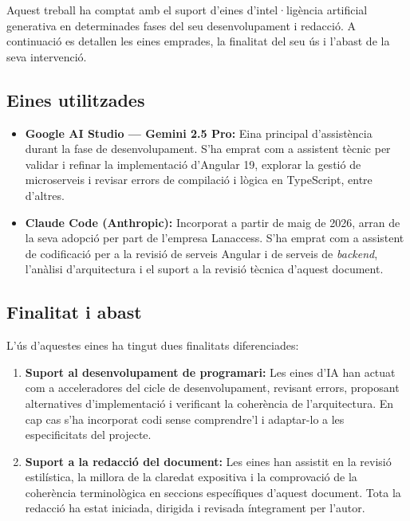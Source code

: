 Aquest treball ha comptat amb el suport d'eines d'intel·ligència artificial generativa en determinades fases del seu desenvolupament i redacció. A continuació es detallen les eines emprades, la finalitat del seu ús i l'abast de la seva intervenció.

\subsection*{Eines utilitzades}

\begin{itemize}
    \item \textbf{Google AI Studio — Gemini 2.5 Pro:} Eina principal d'assistència durant la fase de desenvolupament. S'ha emprat com a assistent tècnic per validar i refinar la implementació d'Angular 19, explorar la gestió de microserveis i revisar errors de compilació i lògica en TypeScript, entre d'altres.

    \item \textbf{Claude Code (Anthropic):} Incorporat a partir de maig de 2026, arran de la seva adopció per part de l'empresa Lanaccess. S'ha emprat com a assistent de codificació per a la revisió de serveis Angular i de serveis de \textit{backend}, l'anàlisi d'arquitectura i el suport a la revisió tècnica d'aquest document.
\end{itemize}

\subsection*{Finalitat i abast}

L'ús d'aquestes eines ha tingut dues finalitats diferenciades:

\begin{enumerate}
    \item \textbf{Suport al desenvolupament de programari:} Les eines d'IA han actuat com a acceleradores del cicle de desenvolupament, revisant errors, proposant alternatives d'implementació i verificant la coherència de l'arquitectura. En cap cas s'ha incorporat codi sense comprendre'l i adaptar-lo a les especificitats del projecte.

    \item \textbf{Suport a la redacció del document:} Les eines han assistit en la revisió estilística, la millora de la claredat expositiva i la comprovació de la coherència terminològica en seccions específiques d'aquest document. Tota la redacció ha estat iniciada, dirigida i revisada íntegrament per l'autor.
\end{enumerate}

